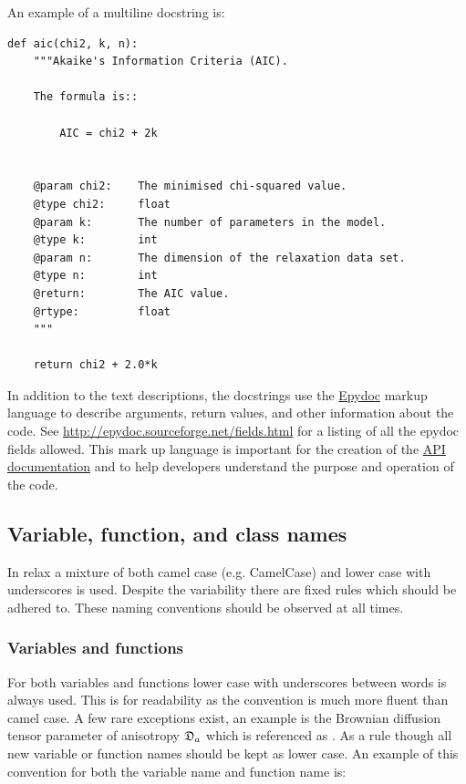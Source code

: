 An example of a multiline docstring is:

\begin{lstlisting}
def aic(chi2, k, n):
    """Akaike's Information Criteria (AIC).

    The formula is::

        AIC = chi2 + 2k


    @param chi2:    The minimised chi-squared value.
    @type chi2:     float
    @param k:       The number of parameters in the model.
    @type k:        int
    @param n:       The dimension of the relaxation data set.
    @type n:        int
    @return:        The AIC value.
    @rtype:         float
    """

    return chi2 + 2.0*k
\end{lstlisting}

In addition to the text descriptions, the docstrings use the \href{http://epydoc.sourceforge.net/}{Epydoc} markup language to describe arguments, return values, and other information about the code.
See \href{http://epydoc.sourceforge.net/fields.html}{http://epydoc.sourceforge.net/fields.html} for a listing of all the epydoc fields allowed.
This mark up language is important for the creation of the \href{http://www.nmr-relax.com/api/}{API documentation} and to help developers understand the purpose and operation of the code.


\subsection{Variable, function, and class names}

In relax a mixture of both camel case (e.g. CamelCase) and lower case with underscores is used.
Despite the variability there are fixed rules which should be adhered to.
These naming conventions should be observed at all times.



\subsubsection{Variables and functions}

For both variables and functions lower case with underscores between words is always used.
This is for readability as the convention is much more fluent than camel case.
A few rare exceptions exist, an example is the Brownian diffusion tensor parameter of anisotropy $\mathfrak{D}_a$ which is referenced as .
As a rule though all new variable or function names should be kept as lower case.
An example of this convention for both the variable name and function name is:

